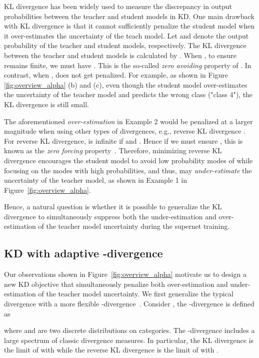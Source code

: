 \documentclass{article}
\begin{document}
KL divergence has been widely used to measure the discrepancy in output probabilities between the teacher and student models in KD. 
One main drawback with KL divergence is that it cannot sufficiently penalize the student model when it over-estimates the uncertainty of the teach model.
Let  and  denote the output probability of the teacher and student models, respectively. The KL divergence between the teacher and student models is calculated by . When , to ensure  remains finite, we must have . This is the so-called \emph{zero avoiding} property of . In contrast, when ,  does not get penalized. 
For example, as shown in Figure \ref{fig:overview_alpha} (b) and (c), even though the student model over-estimates the uncertainty of the teacher model and predicts the wrong class ("class 4"), the KL divergence is still small.


The aforementioned \emph{over-estimation} in Example 2 would be penalized
at a larger magnitude when using other types of divergences, e.g., reverse KL divergence . 
For reverse KL divergence, 
 is infinite if  and . 
Hence if  we must ensure , this is known as the \emph{zero forcing} property~\citep{murphy2012machine}. 
Therefore, minimizing reverse KL divergence encourages the student model  to avoid low probability modes of  while focusing on the modes with high probabilities, and thus, may \emph{under-estimate} the uncertainty of the teacher model, as shown in Example 1 in Figure~\ref{fig:overview_alpha}. 

Hence, a natural question is whether it is possible to generalize the KL divergence to simultaneously suppress both the under-estimation and over-estimation of the teacher model uncertainty during the supernet training.

\subsection{KD with adaptive -divergence}
Our observations shown in Figure~\ref{fig:overview_alpha} motivate us to design a new KD objective that 
simultaneously penalize both over-estimation and under-estimation of the teacher model uncertainty. 
We first generalize the typical  divergence with a more flexible -divergence~\citep{minka2005divergence}. 
Consider , 
the -divergence is defined as 

where  and  are two discrete distributions on  categories. 
The -divergence includes a large spectrum of classic divergence measures. In particular, 
the KL divergence    is the limit of  with  while the reverse KL divergence  is the limit of  with .
\end{document}
